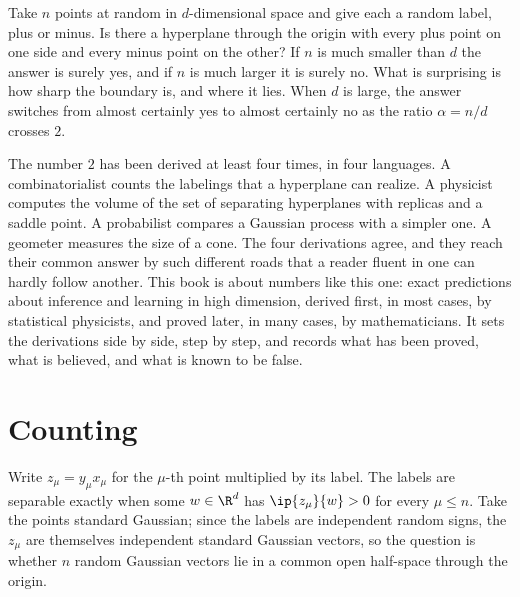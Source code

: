 \begin{refsection}

Take $n$ points at random in $d$-dimensional space and give each a random label, plus or minus. Is there a hyperplane through the origin with every plus point on one side and every minus point on the other? If $n$ is much smaller than $d$ the answer is surely yes, and if $n$ is much larger it is surely no. What is surprising is how sharp the boundary is, and where it lies. When $d$ is large, the answer switches from almost certainly yes to almost certainly no as the ratio $\alpha=n/d$ crosses $2$.

The number $2$ has been derived at least four times, in four languages. A combinatorialist counts the labelings that a hyperplane can realize. A physicist computes the volume of the set of separating hyperplanes with replicas and a saddle point. A probabilist compares a Gaussian process with a simpler one. A geometer measures the size of a cone. The four derivations agree, and they reach their common answer by such different roads that a reader fluent in one can hardly follow another. This book is about numbers like this one: exact predictions about inference and learning in high dimension, derived first, in most cases, by statistical physicists, and proved later, in many cases, by mathematicians. It sets the derivations side by side, step by step, and records what has been proved, what is believed, and what is known to be false.

\section*{Counting}

Write $z_\mu=y_\mu x_\mu$ for the $\mu$-th point multiplied by its label. The labels are separable exactly when some $w\in\R^d$ has $\ip{z_\mu}{w}>0$ for every $\mu\le n$. Take the points standard Gaussian; since the labels are independent random signs, the $z_\mu$ are themselves independent standard Gaussian vectors, so the question is whether $n$ random Gaussian vectors lie in a common open half-space through the origin.


\end{refsection}
